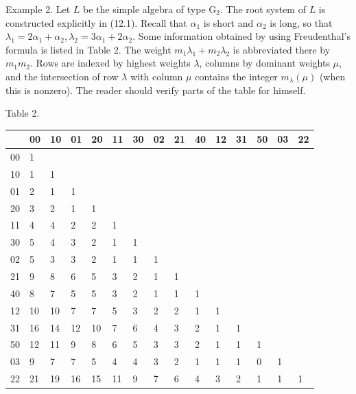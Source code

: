 \documentclass[10pt]{article}
\begin{document}
Example 2. Let $L$ be the simple algebra of type $\mathrm{G}_{2}$. The root system of $L$ is constructed explicitly in (12.1). Recall that $\alpha_{1}$ is short and $\alpha_{2}$ is long, so that $\lambda_{1}=2 \alpha_{1}+\alpha_{2}, \lambda_{2}=3 \alpha_{1}+2 \alpha_{2}$. Some information obtained by using Freudenthal's formula is listed in Table 2. The weight $m_{1} \lambda_{1}+m_{2} \lambda_{2}$ is abbreviated there by $m_{1} m_{2}$. Rows are indexed by highest weights $\lambda$, columns by dominant weights $\mu$, and the intersection of row $\lambda$ with column $\mu$ contains the integer $m_{\lambda}(\mu)$ (when this is nonzero). The reader should verify parts of the table for himself.

Table 2.

\begin{center}
\begin{tabular}{|l|l|l|l|l|l|l|l|l|l|l|l|l|l|l|}
\hline
 & 00 & 10 & 01 & 20 & 11 & 30 & 02 & 21 & 40 & 12 & 31 & 50 & 03 & 22 \\
\hline
00 & 1 &  &  &  &  &  &  &  &  &  &  &  &  &  \\
\hline
10 & 1 & 1 &  &  &  &  &  &  &  &  &  &  &  &  \\
\hline
01 & 2 & 1 & 1 &  &  &  &  &  &  &  &  &  &  &  \\
\hline
20 & 3 & 2 & 1 & 1 &  &  &  &  &  &  &  &  &  &  \\
\hline
11 & 4 & 4 & 2 & 2 & 1 &  &  &  &  &  &  &  &  &  \\
\hline
30 & 5 & 4 & 3 & 2 & 1 & 1 &  &  &  &  &  &  &  &  \\
\hline
02 & 5 & 3 & 3 & 2 & 1 & 1 & 1 &  &  &  &  &  &  &  \\
\hline
21 & 9 & 8 & 6 & 5 & 3 & 2 & 1 & 1 &  &  &  &  &  &  \\
\hline
40 & 8 & 7 & 5 & 5 & 3 & 2 & 1 & 1 & 1 &  &  &  &  &  \\
\hline
12 & 10 & 10 & 7 & 7 & 5 & 3 & 2 & 2 & 1 & 1 &  &  &  &  \\
\hline
31 & 16 & 14 & 12 & 10 & 7 & 6 & 4 & 3 & 2 & 1 & 1 &  &  &  \\
\hline
50 & 12 & 11 & 9 & 8 & 6 & 5 & 3 & 3 & 2 & 1 & 1 & 1 &  &  \\
\hline
03 & 9 & 7 & 7 & 5 & 4 & 4 & 3 & 2 & 1 & 1 & 1 & 0 & 1 &  \\
\hline
22 & 21 & 19 & 16 & 15 & 11 & 9 & 7 & 6 & 4 & 3 & 2 & 1 & 1 & 1 \\
\hline
\end{tabular}
\end{center}
\end{document}
